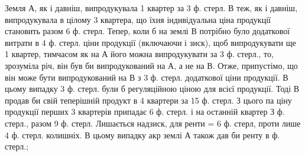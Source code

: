 Земля А, як і давніш, випродукувала 1 квартер за 3 ф. стерл. В теж,
як і давніш, випродукувала в цілому 3   квартера, що їхня індивідуальна ціна
продукції становить разом 6 ф. стерл. Тепер, коли б на землі В потрібно було
додаткової витрати в 4 ф. стерл. ціни продукції (включаючи і зиск), щоб випродукувати ще 1 квартер,
тимчасом як на А його можна випродукувати за
3  ф. стерл., то, зрозуміла річ, він був би випродукований на А, а не на В.
Отже, припустімо, що він може бути випродукований на В з 3   ф. стерл.
додаткової ціни продукції. В цьому випадку 3     ф. стерл. були б регуляційною ціною
для всієї продукції. Тоді В продав би свій теперішній продукт в 4    квартери за
15     ф. стерл. З цього па ціну продукції перших 3    квартерів припадає
6 ф. стерл. і на останній квартер З     ф. стерл., разом 9    ф. стерл. Лишається
надзиск, для ренти = 6     ф. стерл, проти лише 4     ф. стерл. колишніх.
В цьому випадку акр землі А також дав би ренту в    ф. стерл.;
\parbreak{}  %
